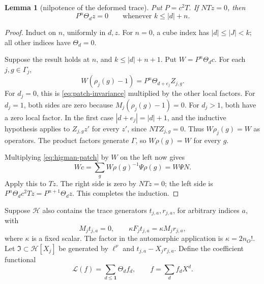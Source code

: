 \documentclass[11pt,a4paper]{article}
\newtheorem{lemma}[theorem]{Lemma}
\theoremstyle{definition}
\begin{document}
\begin{lemma}[nilpotence of the deformed trace]
\label{lem:patch-nilpotence}
Put \(P=c^2T\). If \(NTz=0\), then
\[
 P^n\Theta_d z=0\qquad\text{whenever }k\le|d|+n.
\]
\end{lemma}
\begin{proof}
Induct on \(n\), uniformly in \(d,z\).
For \(n=0\), a cube index has \(|d|\le|J|<k\);
all other indices have \(\Theta_d=0\).

Suppose the result holds at \(n\), and
\(k\le|d|+n+1\). Put \(W=P^n\Theta_d c\).
For each \(j,g\in\Gamma_j\),
\[
 W(\rho_j(g)-1)=P^n\Theta_{d+e_j}Z_{j,g}.
\]
For \(d_j=0\), this is
\eqref{eq:patch-invariance} multiplied by the
other local factors. For \(d_j=1\), both
sides are zero because
\(M_j(\rho_j(g)-1)=0\).
For \(d_j>1\), both have a zero local factor.
In the first case
\(|d+e_j|=|d|+1\), and the inductive
hypothesis applies to \(Z_{j,g}z'\) for
every \(z'\), since \(NTZ_{j,g}=0\).
Thus \(W\rho_j(g)=W\) as operators.
The product factors generate \(\Gamma\),
so \(W\rho(g)=W\) for every \(g\).

Multiplying \eqref{eq:higman-patch} by \(W\)
on the left now gives
\[
 Wc=\sum_g W\rho(g)^{-1}\Psi\rho(g)
                         =W\Psi N.
\]
Apply this to \(Tz\).
The right side is zero by \(NTz=0\);
the left side is
\(P^n\Theta_dc^2Tz=P^{n+1}\Theta_dz\).
This completes the induction.
\end{proof}

Suppose \(\mathcal H\) also contains the
trace generators \(t_{j,a},r_{j,a}\), for
arbitrary indices \(a\), with
\begin{equation}\label{eq:patch-trace-relations}
 M_jt_{j,a}=0,\qquad
 \kappa F_jt_{j,a}=\kappa M_jr_{j,a},
\end{equation}
where \(\kappa\) is a fixed scalar.
The factor in the automorphic application is
\(\kappa=2n_O!\).
Let \(\mathfrak I\subset\mathcal H[X_j]\)
be generated by \(\ell^\nu\) and
\(t_{j,a}-X_jr_{j,a}\).
Define the coefficient functional
\[
 \mathscr L(f)=\sum_{d\le\mathbf1}\Theta_d f_d,
                  \qquad f=\sum_d f_dX^d.
\]
\end{document}
